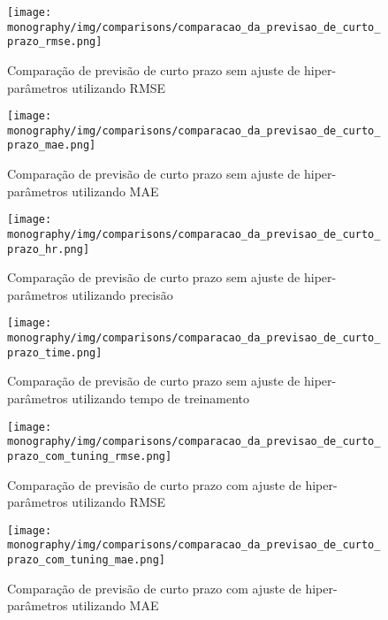 \label{attachment:comparisons}

\begin{figure}[htbp]
    \centering
    \texttt{[image: monography/img/comparisons/comparacao\_da\_previsao\_de\_curto\_prazo\_rmse.png]}
    \label{figure:previsao_de_curto_prazo_rmse}
    \caption{Comparação de previsão de curto prazo sem ajuste de hiper-parâmetros utilizando RMSE}
\end{figure}

\begin{figure}[htbp]
    \centering
    \texttt{[image: monography/img/comparisons/comparacao\_da\_previsao\_de\_curto\_prazo\_mae.png]}
    \label{figure:previsao_de_curto_prazo_mae}
    \caption{Comparação de previsão de curto prazo sem ajuste de hiper-parâmetros utilizando MAE}
\end{figure}

\begin{figure}[htbp]
    \centering
    \texttt{[image: monography/img/comparisons/comparacao\_da\_previsao\_de\_curto\_prazo\_hr.png]}
    \label{figure:previsao_de_curto_prazo_hr}
    \caption{Comparação de previsão de curto prazo sem ajuste de hiper-parâmetros utilizando precisão}
\end{figure}

\begin{figure}[htbp]
    \centering
    \texttt{[image: monography/img/comparisons/comparacao\_da\_previsao\_de\_curto\_prazo\_time.png]}
    \label{figure:previsao_de_curto_prazo_time}
    \caption{Comparação de previsão de curto prazo sem ajuste de hiper-parâmetros utilizando tempo de treinamento}
\end{figure}

\begin{figure}[htbp]
    \centering
    \texttt{[image: monography/img/comparisons/comparacao\_da\_previsao\_de\_curto\_prazo\_com\_tuning\_rmse.png]}
    \label{figure:previsao_de_curto_prazo_com_tuning_rmse}
    \caption{Comparação de previsão de curto prazo com ajuste de hiper-parâmetros utilizando RMSE}
\end{figure}

\begin{figure}[htbp]
    \centering
    \texttt{[image: monography/img/comparisons/comparacao\_da\_previsao\_de\_curto\_prazo\_com\_tuning\_mae.png]}
    \label{figure:previsao_de_curto_prazo_com_tuning_mae}
    \caption{Comparação de previsão de curto prazo com ajuste de hiper-parâmetros utilizando MAE}
\end{figure}

